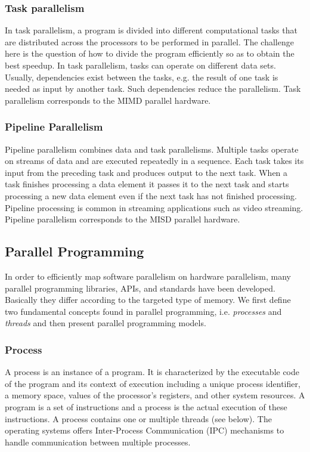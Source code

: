 \subsubsection{Task parallelism}
In task parallelism, a program is divided into different computational tasks that are distributed across the processors to be performed in parallel. The challenge here is the question of how to divide the program efficiently so as to obtain the best speedup. In task parallelism, tasks can operate on different data sets. Usually, dependencies exist between the tasks, e.g. the result of one task is needed as input by another task. Such dependencies reduce the parallelism. Task parallelism corresponds to the MIMD parallel hardware.

\subsubsection{Pipeline Parallelism}

Pipeline parallelism combines data and task parallelisms. Multiple tasks operate on streams of data and are executed repeatedly in a sequence. Each task takes its input from the preceding task and produces output to the next task. When a task finishes processing a data element it passes it to the next task and starts processing a new data element even if the next task has not finished processing. Pipeline processing is common in streaming applications such as video streaming. Pipeline parallelism corresponds to the MISD parallel hardware. 

\subsection{Parallel Programming}

In order to efficiently map software parallelism on hardware parallelism, many parallel programming libraries, APIs, and standards have been developed. Basically they differ according to the targeted type of memory. We first define two fundamental concepts found in parallel programming, i.e. \textit{processes} and \textit{threads} and then present parallel programming models.

\subsubsection{Process}

A process is an instance of a program. It is characterized by the executable code of the program and its context of execution including a unique process identifier, a memory space, values of the processor's registers, and other system resources. A program is a set of instructions and a process is the actual execution of these instructions. A process contains one or multiple threads (see below). The operating systems offers Inter-Process Communication (IPC) mechanisms to handle communication between multiple processes.

